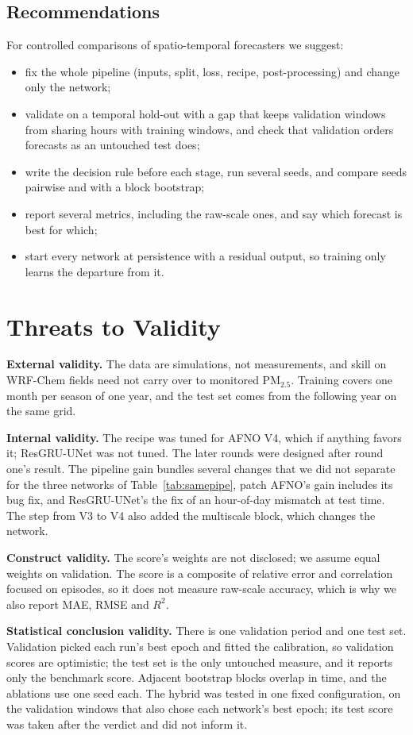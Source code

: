 \documentclass[journal]{IEEEtran}
\newcommand{\PM}{PM$_{2.5}$}
\begin{document}
\subsection{Recommendations}
For controlled comparisons of spatio-temporal forecasters we suggest:
\begin{itemize}
\item fix the whole pipeline (inputs, split, loss, recipe, post-processing) and change only the network;
\item validate on a temporal hold-out with a gap that keeps validation windows from sharing hours with training windows, and check that validation orders forecasts as an untouched test does;
\item write the decision rule before each stage, run several seeds, and compare seeds pairwise and with a block bootstrap;
\item report several metrics, including the raw-scale ones, and say which forecast is best for which;
\item start every network at persistence with a residual output, so training only learns the departure from it.
\end{itemize}

\section{Threats to Validity}
\label{sec:threats}
\textbf{External validity.} The data are simulations, not measurements, and skill on WRF-Chem fields need not carry over to monitored \PM. Training covers one month per season of one year, and the test set comes from the following year on the same grid.

\textbf{Internal validity.} The recipe was tuned for AFNO V4, which if anything favors it; ResGRU-UNet was not tuned. The later rounds were designed after round one's result. The pipeline gain bundles several changes that we did not separate for the three networks of Table~\ref{tab:samepipe}, patch AFNO's gain includes its bug fix, and ResGRU-UNet's the fix of an hour-of-day mismatch at test time. The step from V3 to V4 also added the multiscale block, which changes the network.

\textbf{Construct validity.} The score's weights are not disclosed; we assume equal weights on validation. The score is a composite of relative error and correlation focused on episodes, so it does not measure raw-scale accuracy, which is why we also report MAE, RMSE and $R^2$.

\textbf{Statistical conclusion validity.} There is one validation period and one test set. Validation picked each run's best epoch and fitted the calibration, so validation scores are optimistic; the test set is the only untouched measure, and it reports only the benchmark score. Adjacent bootstrap blocks overlap in time, and the ablations use one seed each. The hybrid was tested in one fixed configuration, on the validation windows that also chose each network's best epoch; its test score was taken after the verdict and did not inform it.
\end{document}

